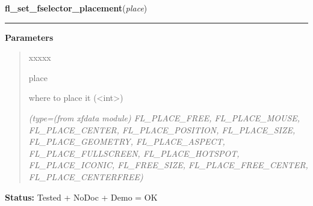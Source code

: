 \hspace{.8\funcindent}\begin{boxedminipage}{\funcwidth}

    \raggedright \textbf{fl\_set\_fselector\_placement}(\textit{place})

    \vspace{-1.5ex}

    \rule{\textwidth}{0.5\fboxrule}
\setlength{\parskip}{2ex}
\setlength{\parskip}{1ex}
      \textbf{Parameters}
      \vspace{-1ex}

      \begin{quote}
        \begin{Ventry}{xxxxx}

          \item[place]

          where to place it ({\textless}int{\textgreater})

            {\it (type=(from xfdata module) FL\_PLACE\_FREE, FL\_PLACE\_MOUSE, FL\_PLACE\_CENTER, 
FL\_PLACE\_POSITION, FL\_PLACE\_SIZE, FL\_PLACE\_GEOMETRY, 
FL\_PLACE\_ASPECT, FL\_PLACE\_FULLSCREEN, FL\_PLACE\_HOTSPOT, 
FL\_PLACE\_ICONIC, FL\_FREE\_SIZE, FL\_PLACE\_FREE\_CENTER, 
FL\_PLACE\_CENTERFREE)}

        \end{Ventry}

      \end{quote}

\textbf{Status:} Tested + NoDoc + Demo = OK



    \end{boxedminipage}

    \label{xformslib:library:fl_set_fselector_border}

    \vspace{0.5ex}

